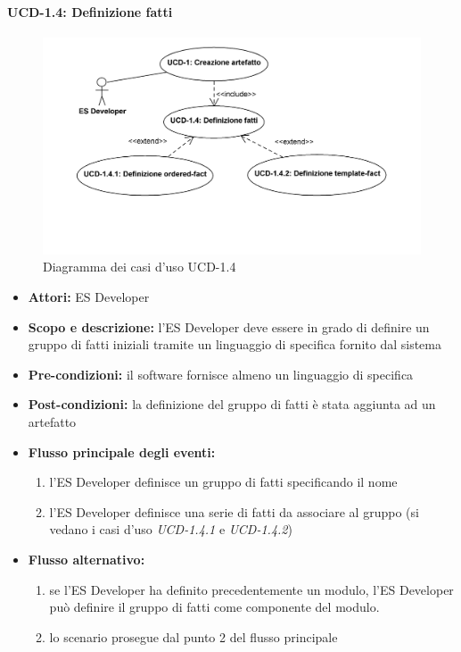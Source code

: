\paragraph{UCD-1.4: Definizione fatti} %

\begin{figure}
\centering
\includegraphics[width=1.1\textwidth]{Immagini/Capitolo2/UseCases/UCD-1_4.png}
\caption{Diagramma dei casi d'uso UCD-1.4}\label{fig:uc-ucd-1.4}
\end{figure}

\begin{itemize}
	\item \textbf{Attori:} ES Developer
	\item \textbf{Scopo e descrizione:} l'ES Developer deve essere in grado di definire un gruppo di fatti iniziali tramite un linguaggio di specifica fornito dal sistema
	\item \textbf{Pre-condizioni:} il software fornisce almeno un linguaggio di specifica
	\item \textbf{Post-condizioni:} la definizione del gruppo di fatti è stata aggiunta ad un artefatto
	\item \textbf{Flusso principale degli eventi:}
		\begin{enumerate}
			\item l'ES Developer definisce un gruppo di fatti specificando il nome
			\item l'ES Developer definisce una serie di fatti da associare al gruppo (si vedano i casi d'uso \emph{UCD-1.4.1} e \emph{UCD-1.4.2})
		\end{enumerate}
	\item \textbf{Flusso alternativo:}
		\begin{enumerate}
			\item se l'ES Developer ha definito precedentemente un modulo, l'ES Developer può definire il gruppo di fatti come componente del modulo.
			\item lo scenario prosegue dal punto 2 del flusso principale
		\end{enumerate}
\end{itemize}

